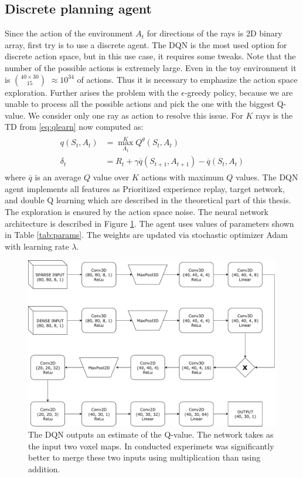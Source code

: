 \subsection{Discrete planning agent}
Since the action of the environment $A_t$ for directions of the rays is 2D binary array, first try is to use a discrete agent. The DQN is the most used option for discrete action space, but in this use case, it requires some tweaks. Note that the number of the possible actions is extremely large. Even in the toy environment it is $40\times30 \choose 15$ $\approx 10^{34}$ of actions. Thus it is necessary to emphasize the action space exploration. Further arises the problem with the $\epsilon$-greedy policy, because we are unable to process all the possible actions and pick the one with the biggest Q-value. We consider only one ray as action to resolve this issue. For $K$ rays is the TD from \eqref{eq:qlearn} now computed as:
\begin{align} \label{eq:dql}
\begin{split}
q(S_t, A_t) &= \max\limits_{A_t}^K Q^\theta(S_t, A_t)\\
\delta_t &= R_t + \gamma \overline{q}(S_{t+1}, A_{t+1}) - \overline{q}(S_t, A_t)
\end{split}
\end{align}
where $\overline{q}$ is an average $Q$ value over $K$ actions with maximum $Q$ values. The DQN agent implements all features as Prioritized experience replay, target network, and double Q learning which are described in the theoretical part of this thesis. The exploration is ensured by the action space noise. The neural network architecture is described in Figure \ref{fig:dqn}. The agent uses values of parameters shown in Table \ref{tab:params}. The weights are updated via stochastic optimizer Adam with learning rate $\lambda$.

\clearpage
\begin{figure}[!h]
\centering
\includegraphics[scale=0.6]{fig/dql.pdf}
\caption[DQN architecture]{The DQN outputs an estimate of the Q-value. The network takes as the input two voxel maps. In conducted experimets was significantly better to merge these two inputs using multiplication than using addition.}
\label{fig:dqn}
\end{figure}

